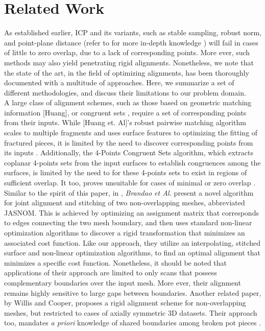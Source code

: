 \documentclass[letterpaper, 10 pt, conference]{ieeeconf}  %
\begin{document}
\section{Related Work}   
	\indent As established earlier, ICP and its variants, such as stable sampling, robust norm, and point-plane distance  (refer to \autocite{Rusinkiewicz:2001:EVO} for more in-depth knowledge ) will fail in cases of little to zero overlap, due to a lack of corresponding points. More ever, such methods may also yield penetrating rigid alignments. Nonetheless, we note that the state of the art, in the field of optimizing alignments, has been thoroughly documented with a multitude of approaches. Here, we summarize a set of different methodologies, and discuss their limitations to our problem domain. \\
	\indent A large class of alignment schemes, such as those based on geometric matching information \autocite{Huang:2006:RFO:1179352.1141925} [Huang], or congruent sets \autocite{Aiger:2008:CSR:1399504.1360684}, require a set of corresponding points from their inputs. While [Huang et. Al]'s robust pairwise matching algorithm scales to multiple fragments and uses surface features to optimizing the fitting of fractured pieces, it is limited by the need to discover corresponding points from its inputs \autocite{Huang:2006:RFO:1179352.1141925}. Additionally, the 4-Points Congruent Sets algorithm, which extracts coplanar 4-points sets from the input surfaces to establish congruences among the surfaces, is limited by the need to for these 4-points sets to exist in regions of sufficient overlap. It too, proves unsuitable for cases of minimal or zero overlap \autocite{Aiger:2008:CSR:1399504.1360684}.\\ 
	\indent Similar to the spirit of this paper, in \autocite{7294872}, \textit{Brandao et Al.} present a novel algorithm for joint alignment and stitching of two non-overlapping meshes, abbreviated JASNOM. This is achieved by optimizing an assignment matrix that corresponds to edges connecting the two mesh boundary, and then uses standard non-linear optimization algorithms to discover a rigid transformation that minimizes an associated cost function. Like our approach, they utilize an interpolating, stitched surface and non-linear optimization algorithms, to find an optimal alignment that minimizes a specific cost function. Nonetheless, it should be noted that applications of their approach are limited to only scans that possess complementary boundaries over the input mesh. More ever, their alignment remains highly sensitive to large gaps between boundaries. Another related paper, by Willis and Cooper, proposes a rigid alignment scheme for non-overlapping meshes, but restricted to cases of axially symmetric 3D datasets. Their approach too, mandates \textit{a priori} knowledge of shared boundaries among broken pot pieces \autocite{1333714}.
    
\end{document}
